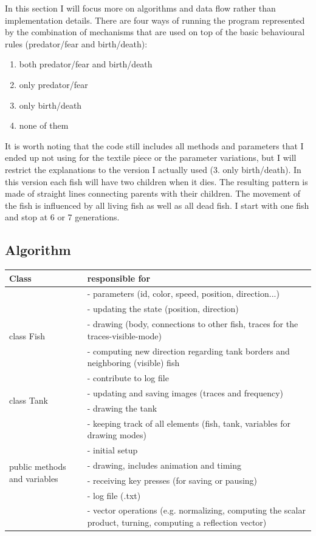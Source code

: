 \documentclass{scrartcl}
\begin{document}
In this section I will focus more on algorithms and data flow rather than implementation details.
There are four ways of running the program represented by the combination of mechanisms that are used on top of the basic behavioural rules (predator/fear and birth/death):
\begin{enumerate}
\item both predator/fear and birth/death
\item only predator/fear
\item only birth/death
\item none of them
\end{enumerate}

It is worth noting that the code still includes all methods and parameters that I ended up not using for the textile piece or the parameter variations, but I will restrict the explanations to the version I actually used (3. only birth/death).
In this version each fish will have two children when it dies. The resulting pattern is made of straight lines connecting parents with their children. The movement of the fish is influenced by all living fish as well as all dead fish. I start with one fish and stop at 6 or 7 generations.

\subsection{Algorithm}

\begin{tabular}{ p{} | p{} }                    
  Class & responsible for \\
  \hline \hline
  \multirow{5}{*}{class Fish}
  		& - parameters (id, color, speed, position, direction...) \\
  		& - updating the state (position, direction)\\
  		& - drawing (body, connections to other fish, traces for the traces-visible-mode)\\
  		& - computing new direction regarding tank borders and neighboring (visible) fish\\
  		& - contribute to log file\\
  \hline
  \multirow{2}{*}{class Tank}
  		& - updating and saving images (traces and frequency)\\
  		& - drawing the tank\\
  \hline
  \multirow{6}{*}{public methods and variables}
  		& - keeping track of all elements (fish, tank, variables for drawing modes)\\
  		& - initial setup\\
  		& - drawing, includes animation and timing\\
	  	& - receiving key presses (for saving or pausing)\\
	  	& - log file (.txt)\\
	  	& - vector operations (e.g. normalizing, computing the scalar product, turning, computing a reflection vector)\\
  
  \hline  
\end{tabular}
\end{document}
